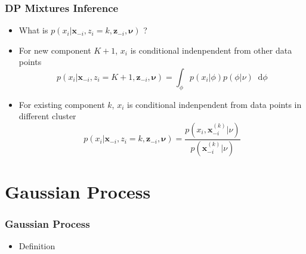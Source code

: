 \documentclass{beamer}
\newcommand*\diff{\mathop{}\!\mathrm{d}}
\begin{document}
\begin{frame}
	\frametitle{DP Mixtures Inference}
	\begin{itemize}
		\item What is $p(x_i|\bm{x}_{-i}, z_i=k, \bm{z}_{-i}, \bm{\nu})$ ?
		\item For new component $K+1$, $x_i$ is conditional indenpendent from other data points
		\[
		p(x_i|\bm{x}_{-i}, z_i=K+1, \bm{z}_{-i}, \bm{\nu})
		= \int_{\phi} p(x_i|\phi)p(\phi | \nu) \diff \phi
		\]
		\item For existing component $k$, $x_i$ is conditional indenpendent from data points in different cluster
		\[
		p(x_i|\bm{x}_{-i}, z_i=k, \bm{z}_{-i}, \bm{\nu})
		= \frac{p(x_i, \bm{x}_{-i}^{(k)}|\nu)}{p(\bm{x}_{-i}^{(k)}|\nu)}
		\]		
	\end{itemize}
\end{frame}

\section{Gaussian Process}
\begin{frame}
	\frametitle{Gaussian Process}
	\begin{itemize}
		\item {Definition}
	\end{itemize}
\end{frame}
\end{document}
